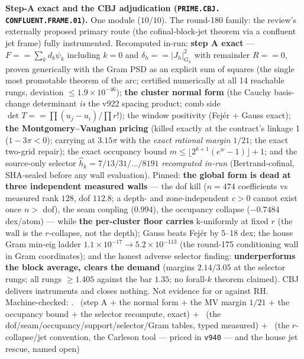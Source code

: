 \documentclass[11pt,a4paper]{article}
\theoremstyle{definition}
\begin{document}
\par\smallskip\noindent\textbf{Step-A exact and the CBJ
adjudication (\texttt{PRIME.\allowbreak CBJ.\allowbreak
CONFLUENT.\allowbreak FRAME.01}).}
One module ($10/10$).  The round-180 family: the review's
externally proposed primary route (the cofinal-block-jet theorem
via a confluent jet frame) fully instrumented.  Recomputed in-run:
\textbf{step A exact} --- $F == \sum_k d_k\psi_k$ including $k = 0$
and $\delta_h == |J_h|^2_{G_h}$ with remainder $R == 0$, proven
generically with the Gram PSD as an explicit sum of squares (the
single most promotable theorem of the arc; certified numerically
at all 14 reachable rungs, deviation $\le 1.9\times10^{-46}$);
\textbf{the cluster normal form} (the Cauchy basis-change
determinant \emph{is} the v922 spacing product; comb side $\det T
== \prod(u_j - u_i)/\prod r!$); the window positivity (Fej\'er $+$
Gauss exact); \textbf{the Montgomery--Vaughan pricing} (killed
exactly at the contract's linkage 1 ($1 - 3\pi < 0$); carrying at
$3.15\pi$ with the \emph{exact rational margin} $1/21$; the exact
two-grid repair); the exact occupancy bound $m \le \lfloor
2^{k+1}(e^w - 1)\rfloor + 1$; and the source-only selector
$\hat h_k = 7/13/31/\ldots/8191$ \emph{recomputed in-run}
(Bertrand-cofinal, SHA-sealed before any wall evaluation).
Pinned: \textbf{the global form is dead at three independent
measured walls} --- the dof kill ($n = 474$ coefficients vs
measured rank $128$, dof $112.8$; a depth- and zone-independent
$c > 0$ cannot exist once $n >$ dof), the seam coupling ($0.994$),
the occupancy collapse ($-0.7484$ dex/atom) --- while \textbf{the
per-cluster floor carries} k-uniformly at fixed $r$ (the wall is
the $r$-collapse, not the depth); Gauss beats Fej\'er by 5--18
dex; the house Gram min-eig ladder $1.1\times10^{-17} \to
5.2\times10^{-113}$ (the round-175 conditioning wall in Gram
coordinates); and the honest adverse selector finding:
\textbf{underperforms the block average, clears the demand}
(margins $2.14/3.05$ at the selector rungs; all rungs $\ge 1.405$
against the bar $1.35$; no forall-$k$ theorem claimed).  CBJ
delivers instruments and closes nothing.  Not evidence for or
against RH.
Machine-checked: .
\mE\ (step A $+$ the normal form $+$ the MV margin $1/21$ $+$ the
occupancy bound $+$ the selector recompute, exact) $+$ \mC\ (the
dof/seam/occupancy/support/selector/Gram tables, typed measured)
$+$ \mO\ (the $r$-collapse/jet convention, the Carleson tool ---
priced in \texttt{v940} --- and the house jet rescue, named open)
\par\smallskip
\end{document}
